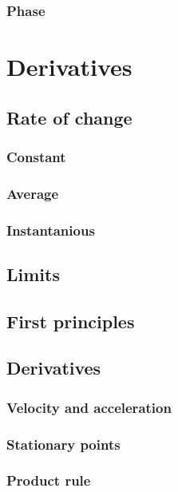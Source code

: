 \documentclass{book}
\begin{document}
\subsection{Phase}

\chapter{Derivatives}
\section{Rate of change}
\subsection{Constant}

\subsection{Average}

\subsection{Instantanious}

\section{Limits}

\section{First principles}

\section{Derivatives}

\subsection{Velocity and acceleration}

\subsection{Stationary points}

\subsection{Product rule}
\end{document}
